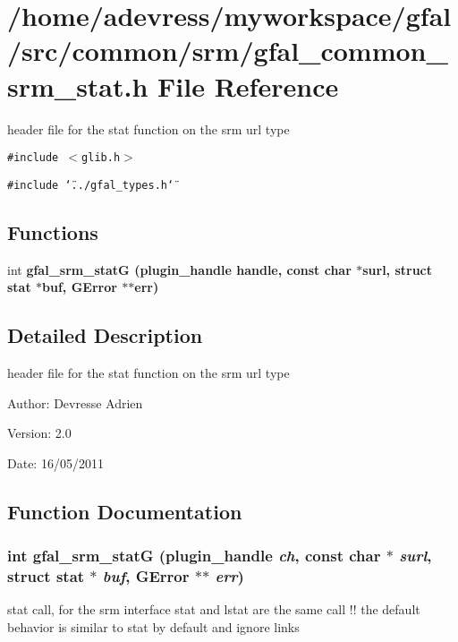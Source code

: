 \section{/home/adevress/myworkspace/gfal/src/common/srm/gfal\_\-common\_\-srm\_\-stat.h File Reference}
\label{gfal__common__srm__stat_8h}
header file for the stat function on the srm url type 

{\tt \#include $<$glib.h$>$}\par
{\tt \#include \char`\"{}../gfal\_\-types.h\char`\"{}}\par
\subsection*{Functions}
\begin{CompactItemize}
\item 
int \bf{gfal\_\-srm\_\-stat\-G} (plugin\_\-handle handle, const char $\ast$surl, struct stat $\ast$buf, GError $\ast$$\ast$err)
\end{CompactItemize}


\subsection{Detailed Description}
header file for the stat function on the srm url type 

\begin{Desc}
\item[Author:]Devresse Adrien \end{Desc}
\begin{Desc}
\item[Version:]2.0 \end{Desc}
\begin{Desc}
\item[Date:]16/05/2011 \end{Desc}


\subsection{Function Documentation}
\subsubsection{\setlength{\rightskip}{0pt plus 5cm}int gfal\_\-srm\_\-stat\-G (plugin\_\-handle {\em ch}, const char $\ast$ {\em surl}, struct stat $\ast$ {\em buf}, GError $\ast$$\ast$ {\em err})}\label{gfal__common__srm__stat_8h_52d92a48e01bae716eb4bdad7ffda34d}


stat call, for the srm interface stat and lstat are the same call !! the default behavior is similar to stat by default and ignore links 